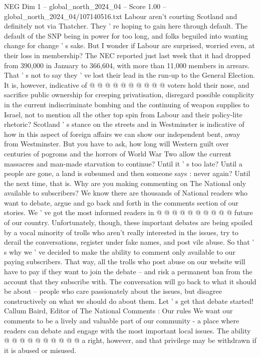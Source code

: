 \begin{textsample}{NEG Dim 1 – global\_north\_2024\_04 – Score 1.00 – global\_north\_2024\_04/107140516.txt}
Labour aren't courting Scotland and definitely not via Thatcher.
They ' re hoping to gain here through default.
The default of the SNP being in power for too long, and folks beguiled into wanting change for change ' s sake.
But I wonder if Labour are surprised, worried even, at their loss in membership?
The NEC reported just last week that it had dropped from 390,000 in January to 366,604, with more than 11,000 members in arrears.
That ' s not to say they ' ve lost their lead in the run-up to the General Election.
It is, however, indicative of @ @ @ @ @ @ @ @ @ @ voters hold their nose, and sacrifice public ownership for creeping privatisation, disregard possible complicity in the current indiscriminate bombing and the continuing of weapon supplies to Israel, not to mention all the other top spin from Labour and their policy-lite rhetoric?
Scotland ' s stance on the streets and in Westminster is indicative of how in this aspect of foreign affairs we can show our independent bent, away from Westminster.
But you have to ask, how long will Western guilt over centuries of pogroms and the horrors of World War Two allow the current massacres and man-made starvation to continue?
Until it ' s too late?
Until a people are gone, a land is subsumed and then someone says : never again?
Until the next time, that is.
Why are you making commenting on The National only available to subscribers?
We know there are thousands of National readers who want to debate, argue and go back and forth in the comments section of our stories.
We ' ve got the most informed readers in @ @ @ @ @ @ @ @ @ @ future of our country.
Unfortunately, though, these important debates are being spoiled by a vocal minority of trolls who aren't really interested in the issues, try to derail the conversations, register under fake names, and post vile abuse.
So that ' s why we ' ve decided to make the ability to comment only available to our paying subscribers.
That way, all the trolls who post abuse on our website will have to pay if they want to join the debate -- and risk a permanent ban from the account that they subscribe with.
The conversation will go back to what it should be about -- people who care passionately about the issues, but disagree constructively on what we should do about them.
Let ' s get that debate started!
Callum Baird, Editor of The National Comments : Our rules We want our comments to be a lively and valuable part of our community - a place where readers can debate and engage with the most important local issues.
The ability @ @ @ @ @ @ @ @ @ @ a right, however, and that privilege may be withdrawn if it is abused or misused.

\end{textsample}
